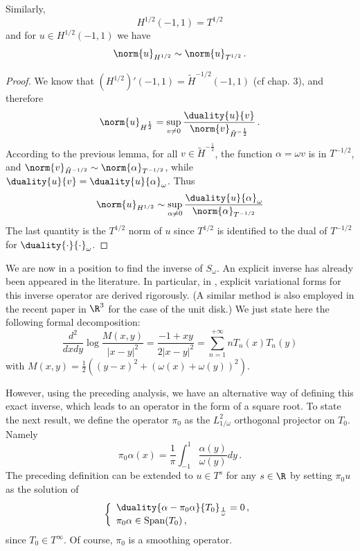 \documentclass[a4paper]{article}
\begin{document}
	\begin{Lem} Similarly,
		\[H^{1/2}(-1,1) = T^{1/2}\]
		and for $u \in H^{1/2}(-1,1)$ we have
		\[\norm{u}_{H^{1/2}} \sim \norm{u}_{T^{1/2}}\,.\]
		\label{LemmaT1/2}
	\end{Lem}	
	\begin{proof}
		We know that $(H^{1/2})'(-1,1) =  \tilde{H}^{-1/2}(-1,1)$ (cf \cite{mclean1986spectral} chap. 3), and therefore
		\[\norm{u}_{H^{\frac{1}{2}}} = \sup_{ v\neq 0} \dfrac{\duality{u}{v}}{\norm{v}_{\tilde{H}^{-\frac{1}{2}}}}\,.\]
		According to the previous lemma, for all $v\in \tilde{H}^{-\frac{1}{2}}$, the function $\alpha = \omega v$ is in $T^{-1/2}$, and $\norm{ v}_{\tilde{H}^{-1/2}} \sim \norm{\alpha}_{T^{-1/2}}$, while $\duality{u}{v} = \duality{u}{\alpha}_\omega$. Thus 
		\[\norm{u}_{H^{1/2}} \sim \sup_{\alpha \neq 0} \dfrac{\duality{u}{\alpha}_\omega}{\norm{\alpha}_{T^{-1/2}}}\]
		The last quantity is the $T^{1/2}$ norm of $u$ since $T^{1/2}$ is identified to the dual of $T^{-1/2}$ for $\duality{\cdot}{\cdot}_\omega$. 
	\end{proof}
	
	We are now in a position to find the inverse of $S_\omega$. An explicit inverse has already been appeared in the literature. In 
	particular, in \cite{jerez2011variational,urzua2014optimal}, explicit variational forms for this inverse operator are derived rigorously. (A similar method is also employed in the recent paper \cite{hiptmair2017closed} in $\R^3$ for the case of the unit disk.) We just state here the following formal decomposition:
	\[\dfrac{d^2}{dxdy}\log\frac{M(x,y)}{|x-y|^2} = \frac{-1+xy}{2|x-y|^2} = \sum_{n=1}^{+ \infty} n T_n(x)T_n(y)\]
	with 
	$M(x,y) = \frac{1}{2}\left((y-x)^2 + (\omega(x) + \omega(y))^2\right) $.
	\\
	
	However, using the preceding analysis, we have an alternative way of defining this exact inverse, which leads to an 
	operator in the form of a square root. To state the next result, we define the operator $\pi_{0}$ as the $L^2_{1/\omega}$ 
	orthogonal projector on $T_0$. Namely 
	\[\pi_0 \alpha(x)  = \frac{1}{\pi} \int_{-1}^{1}\frac{\alpha(y)}{\omega(y)}dy\,.\]
	The preceding definition can be extended to $u \in T^s$ for any $s \in \R$ by setting $\pi_0 u$ as the solution of
	\[\left\{
	\begin{array}{l}\duality{\alpha-\pi_0 \alpha}{T_0}_{\frac{1}{\omega}} = 0\,,\\
	\pi_0\alpha\in \mbox{Span}(T_0)\,,
	\end{array}
	\right.\]
	since $T_0\in T^\infty$. Of course, $\pi_0$ is a smoothing operator. 
	
\end{document}
